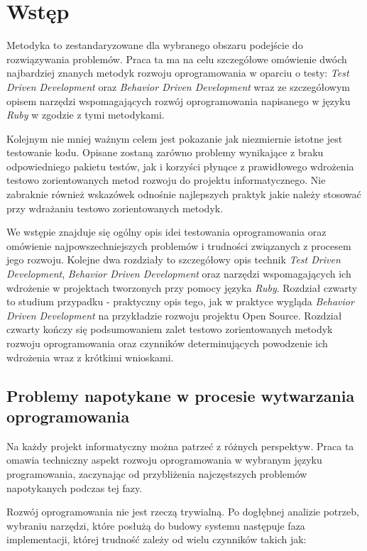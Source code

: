 
\nocite{ruby_way}
\nocite{rails_guides}
\nocite{polish_ruby_forum}

\chapter[Wstęp]{Wstęp}
  Metodyka to zestandaryzowane dla wybranego obszaru podejście do rozwiązywania problemów. Praca ta ma na celu szczegółowe omówienie dwóch najbardziej znanych metodyk rozwoju oprogramowania w oparciu o testy: \emph{Test Driven Development} oraz \emph{Behavior Driven Development} wraz ze szczegółowym opisem narzędzi wspomagających rozwój oprogramowania napisanego w języku \emph{Ruby} w zgodzie z tymi metodykami.
  
  Kolejnym nie mniej ważnym celem jest pokazanie jak niezmiernie istotne jest testowanie kodu. Opisane zostaną zarówno problemy wynikające z braku odpowiedniego pakietu testów, jak i korzyści płynące z prawidłowego wdrożenia testowo zorientowanych metod rozwoju do projektu informatycznego. Nie zabraknie również wskazówek odnośnie najlepszych praktyk jakie należy stosować przy wdrażaniu testowo zorientowanych metodyk.
  
  We wstępie znajduje się ogólny opis idei testowania oprogramowania oraz omówienie najpowszechniejszych problemów i trudności związanych z procesem jego rozwoju. Kolejne dwa rozdziały to szczegółowy opis technik \emph{Test Driven Development}, \emph{Behavior Driven Development} oraz narzędzi wspomagających ich wdrożenie w projektach tworzonych przy pomocy języka \emph{Ruby}. Rozdział czwarty to studium przypadku - praktyczny opis tego, jak w praktyce wygląda \emph{Behavior Driven Development} na przykładzie rozwoju projektu Open Source. Rozdział czwarty kończy się podsumowaniem zalet testowo zorientowanych metodyk rozwoju oprogramowania oraz czynników determinujących powodzenie ich wdrożenia wraz z krótkimi wnioskami.
  
	\section{Problemy napotykane w procesie wytwarzania oprogramowania}
	  Na każdy projekt informatyczny można patrzeć z różnych perspektyw. Praca ta omawia techniczny aspekt rozwoju oprogramowania w wybranym języku programowania, zaczynając od przybliżenia najczęstszych problemów napotykanych podczas tej fazy.
	  
	  Rozwój oprogramowania nie jest rzeczą trywialną. Po dogłębnej analizie potrzeb, wybraniu narzędzi, które posłużą do budowy systemu następuje faza implementacji, której trudność zależy od wielu czynników takich jak:
	  
